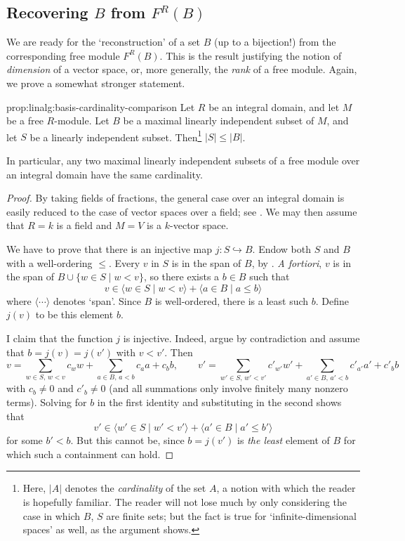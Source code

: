 \subsection{\texorpdfstring{Recovering $B$ from $F^R(B)$}{Recovering B
    from F\^{}R(B)}}
\label{subsec:linalg:recovering-b-from-f-r-b}
We are ready for the `reconstruction' of a set $B$ (up to a
bijection!)  from the corresponding free module $F^R(B)$. This is the
result justifying the notion of \emph{dimension} of a vector space,
or, more generally, the \emph{rank} of a free module. Again, we prove
a somewhat stronger statement.

\begin{prop}{}{prop:linalg:basis-cardinality-comparison}
  Let $R$ be an integral domain, and let $M$ be a free $R$-module. Let
  $B$ be a maximal linearly independent subset of $M$, and let $S$ be
  a linearly independent subset. Then\footnote{Here, $|A|$ denotes the
    \emph{cardinality} of the set $A$, a notion with which the reader
    is hopefully familiar. The reader will not lose much by only
    considering the case in which $B$, $S$ are finite sets; but the
    fact is true for `infinite-dimensional spaces' as well, as the
    argument shows.}  $|S| \leq |B|$.

  In particular, any two maximal linearly independent subsets of a
  free module over an integral domain have the same cardinality.
\end{prop}
\begin{proof}
  By taking fields of fractions, the general case over an integral
  domain is easily reduced to the case of vector spaces over a field;
  see
  . We
  may then assume that $R = k$ is a field and $M = V$ is a $k$-vector
  space.

  We have to prove that there is an injective map
  $j : S \hookrightarrow B$. Endow both $S$ and $B$ with a
  well-ordering $\leq$. Every $v$ in $S$ is in the span of $B$, by
  . \emph{A
    fortiori}, $v$ is in the span of $B \cup \{w \in S \mid w < v\}$,
  so there exists a $b \in B$ such that
  \[
    v \in \langle w \in S \mid w < v \rangle + \langle a \in B \mid a \leq b \rangle
  \]
  where $\langle \cdots \rangle$ denotes `span'. Since $B$ is
  well-ordered, there is a least such $b$. Define $j(v)$ to be this
  element $b$.

  I claim that the function $j$ is injective. Indeed, argue by
  contradiction and assume that $b = j(v) = j(v')$ with $v < v'$. Then
  \[
    v = \sum_{w \in S,\, w < v} c_w w + \sum_{a \in B,\, a < b} c_a a + c_b b, \qquad
    v' = \sum_{w' \in S,\, w' < v'} c'_{w'} w' + \sum_{a' \in B,\, a' < b} c'_{a'} a' + c'_b b
  \]
  with $c_b \neq 0$ and $c'_b \neq 0$ (and all summations only involve
  finitely many nonzero terms). Solving for $b$ in the first identity
  and substituting in the second shows that
  \[
    v' \in \langle w' \in S \mid w' < v' \rangle + \langle a' \in B \mid a' \leq b' \rangle
  \]
  for some $b' < b$. But this cannot be, since $b = j(v')$ is
  \emph{the least} element of $B$ for which such a containment can
  hold.
\end{proof}


